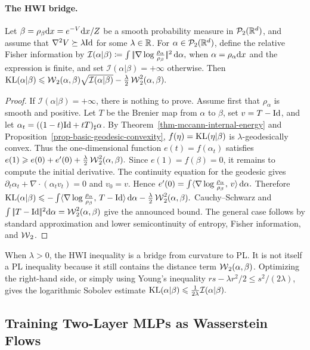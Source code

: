 \paragraph{The HWI bridge.}
\begin{prop}\label{prop-hwi-inequality}
Let $\beta=\rho_\beta\mathrm{d} x=e^{-V}\mathrm{d} x/Z$ be a smooth probability measure in $\mathcal{P}_2(\mathbb{R}^d)$, and assume that $\nabla^2 V\succeq \lambda \mathrm{Id}$ for some $\lambda\in\mathbb{R}$. For $\alpha\in\mathcal{P}_2(\mathbb{R}^d)$, define the relative Fisher information by
\(\mathcal I(\alpha|\beta) \coloneqq \int |\!| \nabla\log\frac{\rho_\alpha}{\rho_\beta} |\!|^2\,\mathrm{d}\alpha,\)
when \(\alpha=\rho_\alpha\mathrm{d} x\) and the expression is finite, and set \(\mathcal I(\alpha|\beta)=+\infty\) otherwise. Then
\(\operatorname{KL}(\alpha|\beta) \leqslant \operatorname{\mathcal{W}}_2(\alpha,\beta)\sqrt{\mathcal I(\alpha|\beta)} -\frac{\lambda}{2}\operatorname{\mathcal{W}}_2^2(\alpha,\beta).\)
\end{prop}
\begin{proof}
If $\mathcal I(\alpha|\beta)=+\infty$, there is nothing to prove. Assume first that $\rho_\alpha$ is smooth and positive. Let $T$ be the Brenier map from $\alpha$ to $\beta$, set $v=T-\mathrm{Id}$, and let $\alpha_t=((1-t)\mathrm{Id}+tT)_\sharp\alpha$. By Theorem~\ref{thm-mccann-internal-energy} and Proposition~\ref{prop-basic-geodesic-convexity}, $f(\eta)=\operatorname{KL}(\eta|\beta)$ is $\lambda$-geodesically convex. Thus the one-dimensional function $e(t)=f(\alpha_t)$ satisfies
\(e(1)\geqslant e(0)+e'(0)+\frac{\lambda}{2}\operatorname{\mathcal{W}}_2^2(\alpha,\beta).\)
Since $e(1)=f(\beta)=0$, it remains to compute the initial derivative. The continuity equation for the geodesic gives $\partial_t\alpha_t+\nabla\cdot(\alpha_t v_t)=0$ and $v_0=v$. Hence
\(e'(0) = \int \langle \nabla\log\frac{\rho_\alpha}{\rho_\beta},\,v\rangle\,\mathrm{d}\alpha.\)
Therefore
\(\operatorname{KL}(\alpha|\beta) \leqslant -\int \langle \nabla\log\frac{\rho_\alpha}{\rho_\beta},\,T-\mathrm{Id}\rangle\,\mathrm{d}\alpha -\frac{\lambda}{2}\operatorname{\mathcal{W}}_2^2(\alpha,\beta).\)
Cauchy--Schwarz and $\int|\!| T-\mathrm{Id} |\!|^2\mathrm{d}\alpha=\operatorname{\mathcal{W}}_2^2(\alpha,\beta)$ give the announced bound. The general case follows by standard approximation and lower semicontinuity of entropy, Fisher information, and $\operatorname{\mathcal{W}}_2$.
\end{proof}
When \(\lambda>0\), the HWI inequality is a bridge from curvature to PL\@. It is not itself a PL inequality because it still contains the distance term \(\operatorname{\mathcal{W}}_2(\alpha,\beta)\). Optimizing the right-hand side, or simply using Young's inequality \(rs-\lambda r^2/2\leq s^2/(2\lambda)\), gives the logarithmic Sobolev estimate
\(\operatorname{KL}(\alpha|\beta) \leqslant \frac{1}{2\lambda}\mathcal I(\alpha|\beta).\)
\subsection{Training Two-Layer MLPs as Wasserstein Flows}
\label{sec-wasserstein-flows-mlp}
